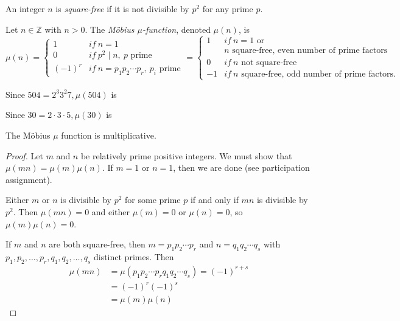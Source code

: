 \documentclass{ximera}
\begin{document}
\begin{definition}
 An integer $n$ is \emph{square-free} if it is not divisible by $p^2$ for any prime $p$.
\end{definition}

\begin{definition}
 Let $n\in\mathbb{Z}$ with $n>0$. The \emph{M\"obius $\mu$-function}, denoted $\mu(n)$, is 
 \[\mu(n)=
\begin{cases}
 1& if\ n=1\\
 0& if\ p^2\mid n,\ p \textrm{ prime}\\
 (-1)^r &if\ n=p_1p_2\cdots p_r,\ p_i \textrm{ prime}
\end{cases}
=
\begin{cases}
 1& if\ n=1\textrm{ or }\\& n \textrm{ square-free, even number of prime factors}\\
 0& if\ n \textrm{ not square-free}\\
 -1&if\  n \textrm{ square-free, odd number of prime factors}.
\end{cases}\]
\end{definition}

\begin{question}
 Since $504=2^3 3^2 7, \mu(504)$ is 
\begin{multipleChoice}
\end{multipleChoice}
Since $30=2\cdot 3 \cdot 5,\mu(30)$ is 
\begin{multipleChoice}
\end{multipleChoice}
\end{question}

\begin{theorem}
 The M\"obius $\mu$ function is multiplicative. 
\end{theorem}
\begin{proof}
 Let $m$ and $n$ be relatively prime positive integers. We must show that $\mu(mn)=\mu(m)\mu(n)$. If $m=1$ or $n=1$, then we are done (see participation assignment). 
 
 Either $m$ or $n$ is divisible by $p^2$ for some prime $p$ if and only if $mn$ is divisible by $p^2$. Then $\mu(mn)=0$ and either $\mu(m)=0$ or $\mu(n)=0$, so $\mu(m)\mu(n)=0$.
 
If $m$ and $n$ are both square-free, then $m=p_1p_2\cdots p_r$ and $n=q_1q_2\cdots q_s$ with $p_1,p_2,\dots,p_r,q_1,q_2,\dots, q_s$ distinct primes. Then
\begin{align*}
 \mu(mn)&=\mu(p_1p_2\cdots p_rq_1q_2\cdots q_s)=(-1)^{r+s}\\
 &=(-1)^r(-1)^s\\
 &=\mu(m)\mu(n)
\end{align*}
\end{proof}
\end{document}
